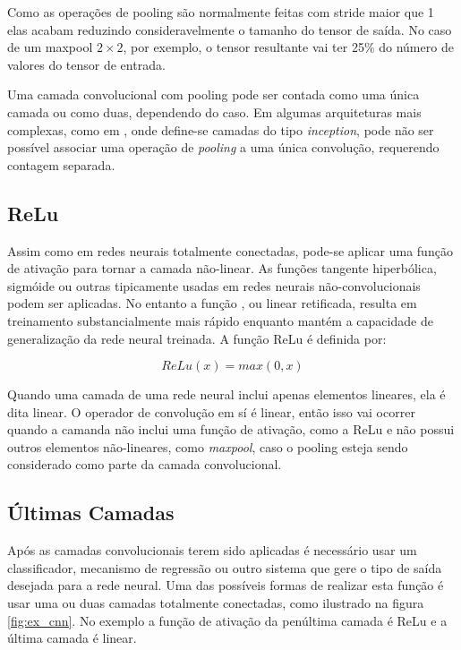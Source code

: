 Como as operações de pooling são normalmente feitas com stride maior que 1 elas
acabam reduzindo consideravelmente o tamanho do tensor de saída. No caso de um
maxpool $2 \times 2$, por exemplo, o tensor resultante vai ter 25\% do
número de valores do tensor de entrada.

Uma camada convolucional com pooling pode ser contada como uma única camada ou
como duas, dependendo do caso. Em algumas arquiteturas mais complexas, como em
\cite{szegedy2015going}, onde define-se camadas do tipo \emph{inception},
pode não ser possível associar uma operação de \emph{pooling} a uma única
convolução, requerendo contagem separada.

\subsection{ReLu}
Assim como em redes neurais totalmente conectadas, pode-se aplicar uma função
de ativação para tornar a camada não-linear. As funções tangente
hiperbólica, sigmóide ou outras tipicamente usadas em redes neurais
não-convolucionais podem ser aplicadas. No entanto a função
, ou
linear retificada, resulta em treinamento substancialmente mais rápido enquanto
mantém a capacidade de generalização da rede neural treinada. A função
ReLu é definida por:


\begin{equation}
	ReLu(x) = max(0,x)
\end{equation}

Quando uma camada de uma rede neural inclui apenas elementos lineares,
ela é dita linear. O operador de convolução em sí é linear, então
isso vai ocorrer quando a camanda não inclui uma função de ativação, como
a ReLu e não possui outros elementos não-lineares, como \emph{maxpool},
caso o pooling esteja sendo considerado como parte da camada convolucional.

\subsection{Últimas Camadas}
Após as camadas convolucionais terem sido aplicadas é necessário usar um
classificador, mecanismo de regressão ou outro sistema que gere o tipo de saída
desejada para a rede neural. Uma das possíveis formas de realizar esta função é
usar uma ou duas camadas totalmente conectadas, como ilustrado na figura
\ref{fig:ex_cnn}. No exemplo a função de ativação da penúltima camada é
ReLu e a última camada é linear.

